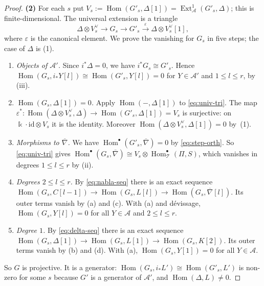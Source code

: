 \documentclass[11pt,reqno]{amsart}
\theoremstyle{plain}
\theoremstyle{definition}
\theoremstyle{remark}
\newcommand{\kk}{\Bbbk}
\DeclareMathOperator{\Hom}{Hom}
\DeclareMathOperator{\Ext}{Ext}
\newcommand{\nablabar}{\overline{\nabla}}
\newcommand{\cA}{\mathcal{A}}
\newcommand{\cT}{\mathcal{T}}
\begin{document}
\begin{proof}
\textbf{(2)} For each $s$ put $V_s:=\Hom(G'_s,\Delta[1])=\Ext^1_\cA(G'_s,\Delta)$; this is finite-dimensional. The universal extension is a triangle
\begin{equation}\label{eq:univ-tri}
\Delta\otimes V_s^\vee\to G_s\to G'_s\xrightarrow{\ \varepsilon\ }\Delta\otimes V_s^\vee[1],
\end{equation}
where $\varepsilon$ is the canonical element. We prove the vanishing for $G_s$ in five steps; the case of $\Delta$ is (1).
\begin{enumerate}[label=(\alph*)]
\item \emph{Objects of $\cA'$.} Since $i^*\Delta=0$, we have $i^*G_s\cong G'_s$. Hence $\Hom(G_s,i_*Y[l])\cong\Hom(G'_s,Y[l])=0$ for $Y\in\cA'$ and $1\le l\le r$, by (iii).
\item \emph{$\Hom(G_s,\Delta[1])=0$.} Apply $\Hom(-,\Delta[1])$ to \eqref{eq:univ-tri}. The map $\varepsilon^*\colon\Hom(\Delta\otimes V_s^\vee,\Delta)\to\Hom(G'_s,\Delta[1])=V_s$ is surjective: on $\kk\cdot\mathrm{id}\otimes V_s$ it is the identity. Moreover $\Hom(\Delta\otimes V_s^\vee,\Delta[1])=0$ by~(1).
\item \emph{Morphisms to $\nablabar$.} We have $\Hom^\bullet(G'_s,\nablabar)=0$ by \eqref{eq:step-orth}. So \eqref{eq:univ-tri} gives $\Hom^\bullet(G_s,\nablabar)\cong V_s\otimes\Hom^\bullet_\cT(\Pi,S)$, which vanishes in degrees $1\le l\le r$ by (ii).
\item \emph{Degrees $2\le l\le r$.} By \eqref{eq:nabla-seq} there is an exact sequence $\Hom(G_s,C[l-1])\to\Hom(G_s,L[l])\to\Hom(G_s,\nablabar[l])$. Its outer terms vanish by (a) and (c). With (a) and d\'evissage, $\Hom(G_s,Y[l])=0$ for all $Y\in\cA$ and $2\le l\le r$.
\item \emph{Degree $1$.} By \eqref{eq:delta-seq} there is an exact sequence $\Hom(G_s,\Delta[1])\to\Hom(G_s,L[1])\to\Hom(G_s,K[2])$. Its outer terms vanish by (b) and (d). With (a), $\Hom(G_s,Y[1])=0$ for all $Y\in\cA$.
\end{enumerate}
So $G$ is projective. It is a generator: $\Hom(G_s,i_*L')\cong\Hom(G'_s,L')$ is non-zero for some $s$ because $G'$ is a generator of $\cA'$, and $\Hom(\Delta,L)\ne0$.


\end{proof}
\end{document}
